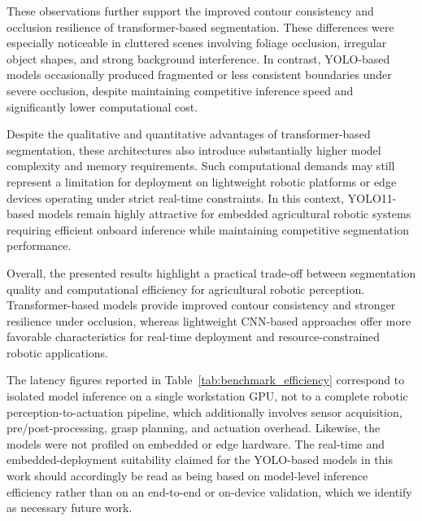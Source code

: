 \documentclass[runningheads]{llncs}
\begin{document}
These observations further support the improved contour consistency and occlusion resilience of transformer-based segmentation. These differences were especially noticeable in cluttered scenes involving foliage occlusion, irregular object shapes, and strong background interference. In contrast, YOLO-based models occasionally produced fragmented or less consistent boundaries under severe occlusion, despite maintaining competitive inference speed and significantly lower computational cost.

Despite the qualitative and quantitative advantages of transformer-based segmentation, these architectures also introduce substantially higher model complexity and memory requirements. Such computational demands may still represent a limitation for deployment on lightweight robotic platforms or edge devices operating under strict real-time constraints. In this context, YOLO11-based models remain highly attractive for embedded agricultural robotic systems requiring efficient onboard inference while maintaining competitive segmentation performance.

Overall, the presented results highlight a practical trade-off between segmentation quality and computational efficiency for agricultural robotic perception. Transformer-based models provide improved contour consistency and stronger resilience under occlusion, whereas lightweight CNN-based approaches offer more favorable characteristics for real-time deployment and resource-constrained robotic applications.

The latency figures reported in Table~\ref{tab:benchmark_efficiency} correspond
to isolated model inference on a single workstation GPU, not to a complete
robotic perception-to-actuation pipeline, which additionally involves sensor
acquisition, pre/post-processing, grasp planning, and actuation overhead.
Likewise, the models were not profiled on embedded or edge hardware. The
real-time and embedded-deployment suitability claimed for the YOLO-based
models in this work should accordingly be read as being based on model-level
inference efficiency rather than on an end-to-end or on-device validation,
which we identify as necessary future work.
\end{document}
